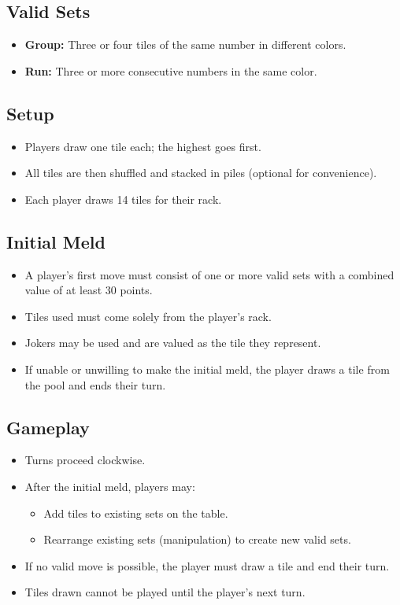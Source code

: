 \documentclass[12pt]{article}
\begin{document}
\subsection{Valid Sets}
\begin{itemize}
    \item \textbf{Group:} Three or four tiles of the same number in different colors.
    \item \textbf{Run:} Three or more consecutive numbers in the same color.
\end{itemize}

\subsection{Setup}
\begin{itemize}
    \item Players draw one tile each; the highest goes first.
    \item All tiles are then shuffled and stacked in piles (optional for convenience).
    \item Each player draws 14 tiles for their rack.
\end{itemize}

\subsection{Initial Meld}
\begin{itemize}
    \item A player's first move must consist of one or more valid sets with a combined value of at least 30 points.
    \item Tiles used must come solely from the player’s rack.
    \item Jokers may be used and are valued as the tile they represent.
    \item If unable or unwilling to make the initial meld, the player draws a tile from the pool and ends their turn.
\end{itemize}

\subsection{Gameplay}
\begin{itemize}
    \item Turns proceed clockwise.
    \item After the initial meld, players may:
    \begin{itemize}
        \item Add tiles to existing sets on the table.
        \item Rearrange existing sets (manipulation) to create new valid sets.
    \end{itemize}
    \item If no valid move is possible, the player must draw a tile and end their turn.
    \item Tiles drawn cannot be played until the player's next turn.
\end{itemize}
\end{document}
